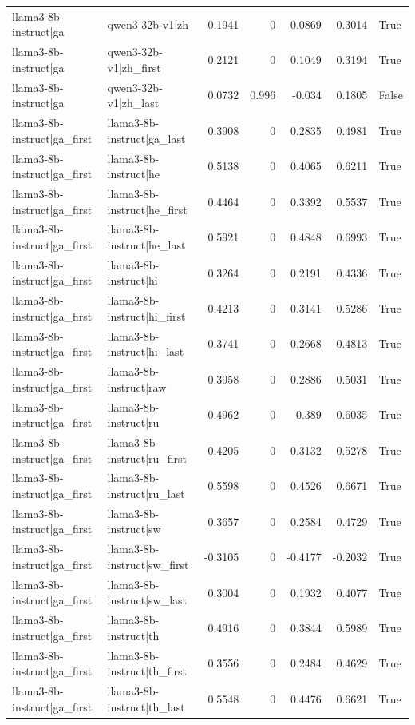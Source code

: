\begin{table}
\begin{tabular}{l l r r r r l}
llama3-8b-instruct|ga & qwen3-32b-v1|zh & 0.1941 & 0 & 0.0869 & 0.3014 & True \\
llama3-8b-instruct|ga & qwen3-32b-v1|zh_first & 0.2121 & 0 & 0.1049 & 0.3194 & True \\
llama3-8b-instruct|ga & qwen3-32b-v1|zh_last & 0.0732 & 0.996 & -0.034 & 0.1805 & False \\
llama3-8b-instruct|ga_first & llama3-8b-instruct|ga_last & 0.3908 & 0 & 0.2835 & 0.4981 & True \\
llama3-8b-instruct|ga_first & llama3-8b-instruct|he & 0.5138 & 0 & 0.4065 & 0.6211 & True \\
llama3-8b-instruct|ga_first & llama3-8b-instruct|he_first & 0.4464 & 0 & 0.3392 & 0.5537 & True \\
llama3-8b-instruct|ga_first & llama3-8b-instruct|he_last & 0.5921 & 0 & 0.4848 & 0.6993 & True \\
llama3-8b-instruct|ga_first & llama3-8b-instruct|hi & 0.3264 & 0 & 0.2191 & 0.4336 & True \\
llama3-8b-instruct|ga_first & llama3-8b-instruct|hi_first & 0.4213 & 0 & 0.3141 & 0.5286 & True \\
llama3-8b-instruct|ga_first & llama3-8b-instruct|hi_last & 0.3741 & 0 & 0.2668 & 0.4813 & True \\
llama3-8b-instruct|ga_first & llama3-8b-instruct|raw & 0.3958 & 0 & 0.2886 & 0.5031 & True \\
llama3-8b-instruct|ga_first & llama3-8b-instruct|ru & 0.4962 & 0 & 0.389 & 0.6035 & True \\
llama3-8b-instruct|ga_first & llama3-8b-instruct|ru_first & 0.4205 & 0 & 0.3132 & 0.5278 & True \\
llama3-8b-instruct|ga_first & llama3-8b-instruct|ru_last & 0.5598 & 0 & 0.4526 & 0.6671 & True \\
llama3-8b-instruct|ga_first & llama3-8b-instruct|sw & 0.3657 & 0 & 0.2584 & 0.4729 & True \\
llama3-8b-instruct|ga_first & llama3-8b-instruct|sw_first & -0.3105 & 0 & -0.4177 & -0.2032 & True \\
llama3-8b-instruct|ga_first & llama3-8b-instruct|sw_last & 0.3004 & 0 & 0.1932 & 0.4077 & True \\
llama3-8b-instruct|ga_first & llama3-8b-instruct|th & 0.4916 & 0 & 0.3844 & 0.5989 & True \\
llama3-8b-instruct|ga_first & llama3-8b-instruct|th_first & 0.3556 & 0 & 0.2484 & 0.4629 & True \\
llama3-8b-instruct|ga_first & llama3-8b-instruct|th_last & 0.5548 & 0 & 0.4476 & 0.6621 & True \\

\end{tabular}
\end{table}
